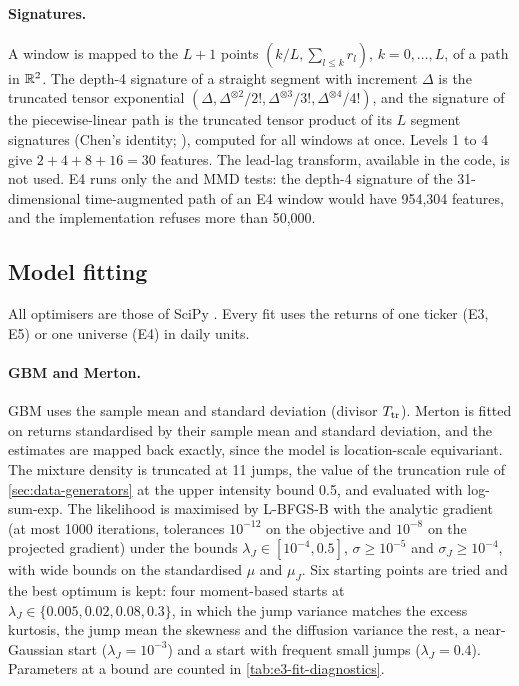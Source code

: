 \paragraph{Signatures.}
A window is mapped to the $L+1$ points $(k/L,\sum_{l\le k}r_l)$, $k=0,\dots,L$, of a path in
$\mathbb{R}^2$. The depth-4 signature of a straight segment with increment $\Delta$ is the truncated
tensor exponential $(\Delta,\Delta^{\otimes2}/2!,\Delta^{\otimes3}/3!,\Delta^{\otimes4}/4!)$,
and the signature of the piecewise-linear path is the truncated tensor product of its $L$
segment signatures (Chen's identity; \citealp{lyons1998differential,chevyrev2016primer}),
computed for all windows at once. Levels 1 to 4 give $2+4+8+16=30$ features. The lead-lag
transform, available in the code, is not used. E4 runs only the \WC{} and MMD tests: the
depth-4 signature of the 31-dimensional time-augmented path of an E4 window would have 954{,}304
features, and the implementation refuses more than 50{,}000.

\subsection{Model fitting}\label{app:impl-fit}

All optimisers are those of SciPy \citep{virtanen_2020_scipy}. Every fit uses the \TRAIN{}
returns of one ticker (E3, E5) or one universe (E4) in daily units.

\paragraph{GBM and Merton.}
GBM uses the sample mean and standard deviation (divisor $T_{\mathrm{tr}}$). Merton is fitted on returns
standardised by their sample mean and standard deviation, and the estimates are mapped back
exactly, since the model is location-scale equivariant. The mixture density is truncated at 11
jumps, the value of the truncation rule of \cref{sec:data-generators} at the upper intensity
bound 0.5, and evaluated with log-sum-exp. The likelihood is maximised by L-BFGS-B with the
analytic gradient (at most 1000 iterations, tolerances $10^{-12}$ on the objective and
$10^{-8}$ on the projected gradient) under the bounds $\lambda_J\in[10^{-4},0.5]$,
$\sigma\ge10^{-5}$ and $\sigma_J\ge10^{-4}$, with wide bounds on the standardised $\mu$ and
$\mu_J$. Six starting points are tried and the best optimum is kept: four moment-based starts
at $\lambda_J\in\{0.005,0.02,0.08,0.3\}$, in which the jump variance matches the excess
kurtosis, the jump mean the skewness and the diffusion variance the rest, a near-Gaussian start
($\lambda_J=10^{-3}$) and a start with frequent small jumps ($\lambda_J=0.4$). Parameters at a
bound are counted in \cref{tab:e3-fit-diagnostics}.

